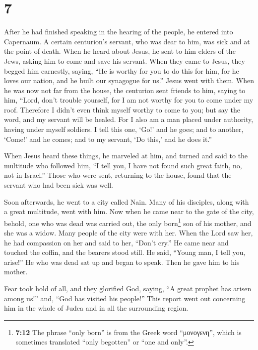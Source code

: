 \hypertarget{section-6}{%
\section{7}\label{section-6}}

 After he had finished speaking in the hearing of the
people, he entered into Capernaum.  A certain centurion's
servant, who was dear to him, was sick and at the point of death.
 When he heard about Jesus, he sent to him elders of the
Jews, asking him to come and save his servant.  When they
came to Jesus, they begged him earnestly, saying, ``He is worthy for you
to do this for him,  for he loves our nation, and he built
our synagogue for us.''  Jesus went with them. When he was
now not far from the house, the centurion sent friends to him, saying to
him, ``Lord, don't trouble yourself, for I am not worthy for you to come
under my roof.  Therefore I didn't even think myself
worthy to come to you; but say the word, and my servant will be healed.
 For I also am a man placed under authority, having under
myself soldiers. I tell this one, `Go!' and he goes; and to another,
`Come!' and he comes; and to my servant, `Do this,' and he does it.''

 When Jesus heard these things, he marveled at him, and
turned and said to the multitude who followed him, ``I tell you, I have
not found such great faith, no, not in Israel.''  Those
who were sent, returning to the house, found that the servant who had
been sick was well.

 Soon afterwards, he went to a city called Nain. Many of
his disciples, along with a great multitude, went with him.
 Now when he came near to the gate of the city, behold,
one who was dead was carried out, the only born\footnote{\textbf{7:12}
  The phrase ``only born'' is from the Greek word ``μονογενη'', which is
  sometimes translated ``only begotten'' or ``one and only''.} son of
his mother, and she was a widow. Many people of the city were with her.
 When the Lord saw her, he had compassion on her and said
to her, ``Don't cry.''  He came near and touched the
coffin, and the bearers stood still. He said, ``Young man, I tell you,
arise!''  He who was dead sat up and began to speak. Then
he gave him to his mother.

 Fear took hold of all, and they glorified God, saying,
``A great prophet has arisen among us!'' and, ``God has visited his
people!''  This report went out concerning him in the
whole of Judea and in all the surrounding region.

